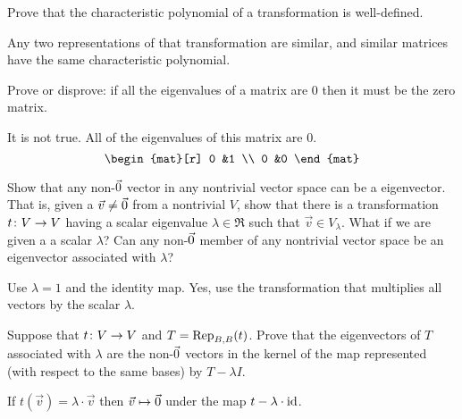 \begin{exercises}
    Prove that 
    the characteristic polynomial of a transformation is well-defined.
    \begin{answer}
      Any two representations of that transformation are similar, and
      similar matrices have the same characteristic polynomial.  
    \end{answer}
  \item Prove or disprove: if all the eigenvalues of a matrix are $0$ 
    then it must be the zero matrix.
    \begin{answer}
      It is not true.
      All of the eigenvalues of this matrix are $0$.
      \begin{equation*}
        \begin{mat}[r]
          0  &1  \\
          0  &0
        \end{mat}
      \end{equation*}
    \end{answer}
  \recommended \item 
    \begin{exparts}
      \partsitem Show that any non-\( \zero \) vector in any nontrivial 
        vector space can be a eigenvector.
        That is, given a \( \vec{v}\neq\zero \) from a nontrivial \( V \),
        show that there is a transformation \( \map{t}{V}{V} \) having a scalar
        eigenvalue \( \lambda\in\Re \) such that \( \vec{v}\in V_\lambda \).
      \partsitem What if we are given a  a scalar \( \lambda \)?
        Can any non-\( \zero \) member of any
        nontrivial vector space be an eigenvector associated with \( \lambda \)?
    \end{exparts}
    \begin{answer}
      \begin{exparts}
        \partsitem Use \( \lambda=1 \) and the identity map.
        \partsitem Yes, use the transformation that multiplies all 
          vectors by the scalar \( \lambda \).
      \end{exparts}  
     \end{answer}
  \recommended \item 
    Suppose that \( \map{t}{V}{V} \) and \( T=\rep{t}{B,B} \).
    Prove that the eigenvectors of \( T \) associated with \( \lambda \) are
    the non-\( \zero \) vectors in the kernel of the map represented
    (with respect to the same bases) by \( T-\lambda I \).
    \begin{answer}
      If $t(\vec{v})=\lambda\cdot\vec{v}$ then 
      $\vec{v}\mapsto\zero$ under the map $t-\lambda\cdot\identity$.

\end{answer}
\end{exercises}
